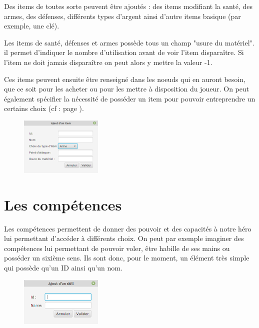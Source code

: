 		Des items de toutes sorte peuvent être ajoutés : des items modifiant la santé, des armes, des défenses, différents types d'argent ainsi d'autre items basique (par exemple, une clé).

		Les items de santé, défenses et armes possède tous un champ "usure du matériel". il permet d'indiquer le nombre d'utilisation avant de voir l'item disparaître. Si l'item ne doit jamais disparaître on peut alors y mettre la valeur -1.

		Ces items peuvent ensuite être renseigné dans les noeuds qui en auront besoin, que ce soit pour les acheter ou pour les mettre à disposition du joueur. On peut également spécifier la nécessité de posséder un item pour pouvoir entreprendre un certains choix (cf :  page \pageref{sec:prerequis}).

		\begin{figure}[H]
			\centering\includegraphics[width=0.35\textwidth, keepaspectratio]{img/itemDialog.png}
		\end{figure}

	\section{Les compétences}
		\label{sec:skills}

		Les compétences permettent de donner des pouvoir et des capacités à notre héro lui permettant d'accéder à différents choix. On peut par exemple imaginer des compétences lui permettant de pouvoir voler, être habille de ses mains ou posséder un sixième sens. Ils sont donc, pour le moment, un élément très simple qui possède qu'un ID ainsi qu'un nom.

		\begin{figure}[H]
			\centering\includegraphics[width=0.35\textwidth, keepaspectratio]{img/skillDialog.png}
		\end{figure}

